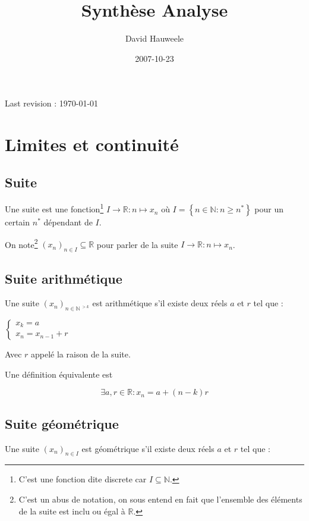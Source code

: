 \documentclass[a4paper,10pt]{article}
\author{David Hauweele}
\title{Synthèse Analyse}
\date{2007-10-23}
\newcommand{\R}{\mathbb{R}}
\newcommand{\N}{\mathbb{N}}
\begin{document}
\maketitle
Last revision : \today




\tableofcontents
\newpage
\section{Limites et continuité}

\subsection{Suite}
Une suite est une fonction\footnote{C'est une fonction dite discrete car $I \subseteq \N$.} $I \rightarrow \mathbb{R} : n \mapsto x_n$ où $I = \left\lbrace n \in \mathbb{N} : n \geq n^* \right\rbrace$ pour un certain $n^*$ dépendant de $I$.

On note\footnote{C'est un abus de notation, on sous entend en fait que l'ensemble des éléments de la suite est inclu ou égal à $\mathbb{R}$.} $(x_n)_{n \in I} \subseteq \mathbb{R}$ pour parler de la suite $I \rightarrow \R : n \mapsto x_n$.

\subsection{Suite arithmétique}

Une suite $(x_n)_{n\in \N^{~>k}}$ est arithmétique s'il existe deux réels $a$ et $r$ tel que :

$\begin{cases} x_k = a\\ x_n = x_{n-1} +r\end{cases}$

Avec $r$ appelé la raison de la suite.

Une définition équivalente est 

$$\exists a,r \in \R : x_n = a + (n-k)r $$

\subsection{Suite géométrique}

Une suite $(x_n)_{n\in I}$ est géométrique s'il existe deux réels $a$ et $r$ tel que : 
\end{document}
